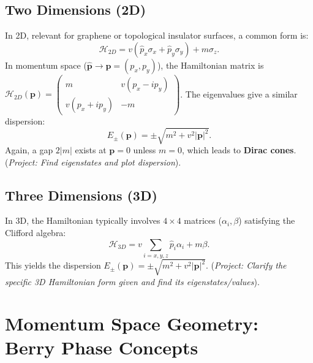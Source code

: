 \documentclass[11pt]{article}
\newcommand{\Hc}{\mathcal{H}}       %
\begin{document}
\subsection{Two Dimensions (2D)}
In 2D, relevant for graphene or topological insulator surfaces, a common form is:
\begin{equation}
\Hc_{2D} = v (\hat{p}_x \sigma_x + \hat{p}_y \sigma_y) + m \sigma_z.
\label{eq:H_2D}
\end{equation}
In momentum space ($\hat{\mathbf{p}} \to \mathbf{p}=(p_x, p_y)$), the Hamiltonian matrix is $\Hc_{2D}(\mathbf{p}) = \begin{pmatrix} m & v(p_x - i p_y) \\ v(p_x + i p_y) & -m \end{pmatrix}$. The eigenvalues give a similar dispersion:
\begin{equation}
E_{\pm}(\mathbf{p}) = \pm \sqrt{m^2 + v^2 |\mathbf{p}|^2}.
\label{eq:dispersion_2D}
\end{equation}
Again, a gap $2|m|$ exists at $\mathbf{p}=0$ unless $m=0$, which leads to \textbf{Dirac cones}. (\textit{Project: Find eigenstates and plot dispersion}).

\subsection{Three Dimensions (3D)}
In 3D, the Hamiltonian typically involves $4 \times 4$ matrices ($\alpha_i, \beta$) satisfying the Clifford algebra:
\begin{equation}
\Hc_{3D} = v \sum_{i=x,y,z} \hat{p}_i \alpha_i + m \beta.
\label{eq:H_3D_standard}
\end{equation}
This yields the dispersion $E_{\pm}(\mathbf{p}) = \pm \sqrt{m^2 + v^2 |\mathbf{p}|^2}$. (\textit{Project: Clarify the specific 3D Hamiltonian form given and find its eigenstates/values}).

\section{Momentum Space Geometry: Berry Phase Concepts}
\end{document}
